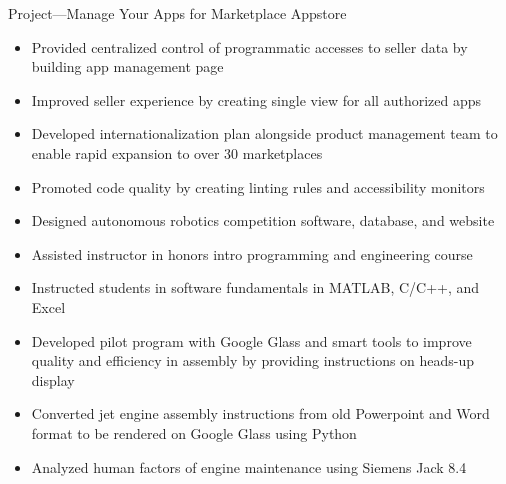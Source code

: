 \documentclass[11pt,letterpaper,ragged2e,withhyper]{altacv}
\newif\ifbubbles
\begin{document}
\begin{paracol}{2}
\par Project—Manage Your Apps for Marketplace Appstore
\begin{itemize}
    \item Provided centralized control of programmatic accesses to seller data by building app management page
    \item Improved seller experience by creating single view for all authorized apps
    \item Developed internationalization plan alongside product management team to enable rapid expansion to over 30 marketplaces
    \item Promoted code quality by creating linting rules and accessibility monitors
\end{itemize}

\ifbubbles
    \cvtag{TypeScript}
    \cvtag{Java}
    \cvtag{React}
    \cvtag{Redux}
    \cvtag{Jest}
    \cvtag{Enzyme}
    \cvtag{REST}
    \cvtag{i18next}
\fi

\divider

\begin{itemize}
    \item Designed autonomous robotics competition software, database, and website
    \item Assisted instructor in honors intro programming and engineering course
    \item Instructed students in software fundamentals in MATLAB, C/C++, and Excel
\end{itemize}

\ifbubbles
    \cvtag{Education}
    \cvtag{C}
    \cvtag{C++}
    \cvtag{MATLAB}
    \cvtag{Excel}
    \cvtag{C\#}
    \cvtag{ASP.NET}
    \cvtag{SQL}
\fi

\divider

\begin{itemize}
    \item Developed pilot program with Google Glass and smart tools to improve quality and efficiency in assembly by providing instructions on heads-up display
    \item Converted jet engine assembly instructions from old Powerpoint and Word format to be rendered on Google Glass using Python
    \item Analyzed human factors of engine maintenance using Siemens Jack 8.4
\end{itemize}


\end{paracol}
\end{document}
